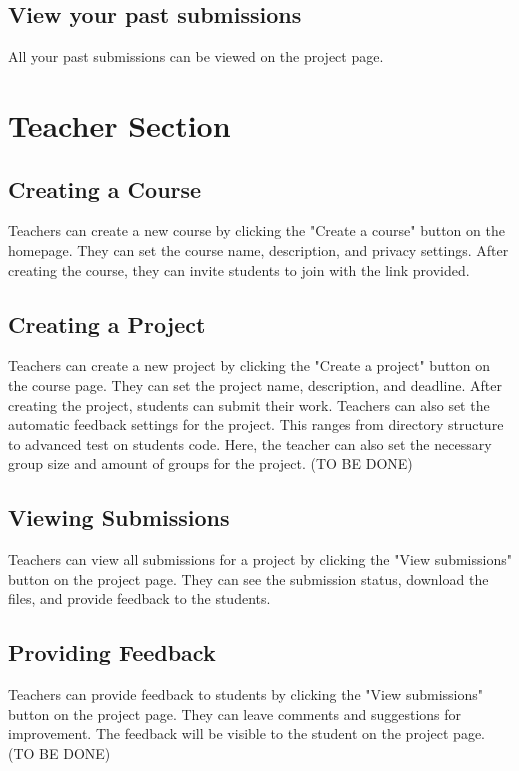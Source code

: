\documentclass{article}
\begin{document}
\subsection{View your past submissions}
All your past submissions can be viewed on the project page.

\section{Teacher Section}

\subsection{Creating a Course}
Teachers can create a new course by clicking the "Create a course" button on the homepage. They can set the course name, description, and privacy settings. After creating the course, they can invite students to join with the link provided.

\subsection{Creating a Project}
Teachers can create a new project by clicking the "Create a project" button on the course page. They can set the project name, description, and deadline. After creating the project, students can submit their work.
Teachers can also set the automatic feedback settings for the project. This ranges from directory structure to advanced test on students code. 
Here, the teacher can also set the necessary group size and amount of groups for the project.
(TO BE DONE)

\subsection{Viewing Submissions}
Teachers can view all submissions for a project by clicking the "View submissions" button on the project page. They can see the submission status, download the files, and provide feedback to the students.

\subsection{Providing Feedback}
Teachers can provide feedback to students by clicking the "View submissions" button on the project page. They can leave comments and suggestions for improvement. The feedback will be visible to the student on the project page. (TO BE DONE)
\end{document}
